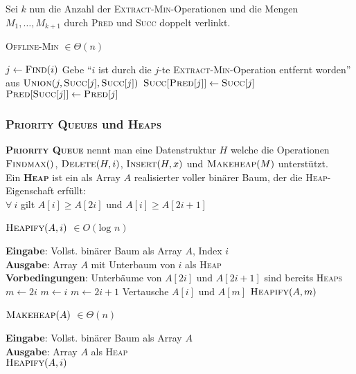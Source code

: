 \documentclass[a4paper,10pt]{scrartcl}
\newcommand{\tbf}{\textbf}
\newcommand{\tsc}{\textsc}
\newcommand{\agn}{\leftarrow}
\newcommand{\Eingabe}[1]{\STATE \tbf{Eingabe}: #1 \\}
\newcommand{\Ausgabe}[1]{\STATE \tbf{Ausgabe}: #1 \\}
\newcommand{\Vorb}[1]{\STATE \tbf{Vorbedingungen}: #1 \\}
\begin{document}
Sei $k$ nun die Anzahl der \tsc{Extract-Min}-Operationen und die Mengen $M_1, \ldots, M_{k+1}$ durch \tsc{Pred} und \tsc{Succ} doppelt verlinkt. \\

\begin{algorithm}
\caption{\tsc{Offline-Min} $\in \Theta(n)$}
\begin{algorithmic}
	\STATE $j \agn \tsc{Find}(i)$
		\STATE Gebe ``$i$ ist durch die $j$-te \tsc{Extract-Min}-Operation entfernt worden'' aus
		\STATE $\tsc{Union}(j,\tsc{Succ}[j],\tsc{Succ}[j])$ \COMMENT{$M_{\tsc{Succ}[j]} = M_j \cup M_{\tsc{Succ}[j]}$}
		\STATE $\tsc{Succ}[\tsc{Pred}[j]] \agn \tsc{Succ}[j]$ 
		\STATE $\tsc{Pred}[\tsc{Succ}[j]] \agn \tsc{Pred}[j]$
	\ENDIF
\ENDFOR
\end{algorithmic}
\end{algorithm}

\subsubsection{\tsc{Priority Queues} und \tsc{Heaps}}
\tbf{\tsc{Priority Queue}} nennt man eine Datenstruktur $H$ welche die Operationen $\tsc{Findmax}()$, $\tsc{Delete}(H,i)$, $\tsc{Insert}(H,x)$ und $\tsc{Makeheap}(M)$ unterstützt. \\

Ein \tbf{\tsc{Heap}} ist ein als Array $A$ realisierter voller binärer Baum, der die \tsc{Heap}-Eigenschaft erfüllt: \\
$\forall \ i$ gilt $A[i] \geq A[2i]$ und $A[i] \geq A[2i + 1]$ \\

\begin{algorithm}
\caption{$\tsc{Heapify}(A,i)$ $\in O(\text{log } n)$}
\begin{algorithmic}
\Eingabe{Vollst. binärer Baum als Array $A$, Index $i$}
\Ausgabe{Array $A$ mit Unterbaum von $i$ als \tsc{Heap}}
\Vorb{Unterbäume von $A[2i]$ und $A[2i + 1]$ sind bereits \tsc{Heaps}}
	\STATE $m \agn 2i$
\ELSE
	\STATE $m \agn i$
\ENDIF
{}
	\STATE $m \agn 2i + 1$
\ENDIF
{}
	\STATE Vertausche $A[i]$ und $A[m]$
	\STATE $\tsc{Heapify}(A,m)$
\ENDIF
\end{algorithmic}
\end{algorithm}

\begin{algorithm}
\caption{$\tsc{Makeheap}(A)$ $\in \Theta(n)$}
\begin{algorithmic}
\Eingabe{Vollst. binärer Baum als Array $A$}
\Ausgabe{Array $A$ als \tsc{Heap}}
	\STATE $\tsc{Heapify}(A,i)$
\ENDFOR
\end{algorithmic}
\end{algorithm}
\end{document}
